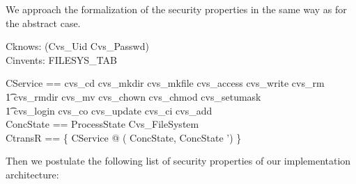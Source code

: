 We approach the formalization of the security properties in the same way as for
the abstract case.
\begin{axdef}
  Cknows: \power (Cvs\_Uid \cross Cvs\_Passwd) \\
  Cinvents: FILESYS\_TAB \\
\end{axdef}
\begin{zed}
  CService == cvs\_cd \lor cvs\_mkdir \lor cvs\_mkfile \lor cvs\_access \lor
  cvs\_write \lor cvs\_rm \\
  \t1 \lor cvs\_rmdir \lor cvs\_mv \lor cvs\_chown \lor cvs\_chmod \lor
  cvs\_setumask \\
  \t1 \lor cvs\_login \lor cvs\_co \lor cvs\_update \lor cvs\_ci \lor cvs\_add
  \\ 
  ConcState == ProcessState \land Cvs\_FileSystem \\
  CtransR == \{ CService @ ( \theta ConcState, \theta ConcState ') \} \star \\
\end{zed}
Then we postulate the following list of security properties of our
implementation architecture:

